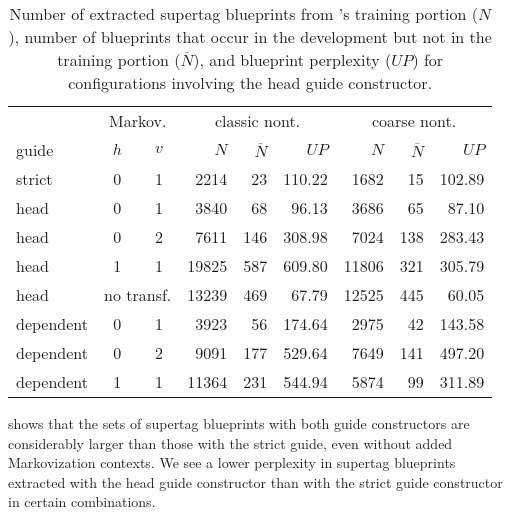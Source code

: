 \documentclass[../../document.tex]{subfiles}
\begin{document}
    \begin{table}
        \caption{\label{tbl:gridsearch:head:1}
        Number of extracted supertag blueprints from \negra{}'s training portion ($N$), number of blueprints that occur in the development but not in the training portion ($\overline{N}$), and blueprint perplexity ($\mathit{UP}$) for configurations involving the head guide constructor.
        }
        \centering
        \vspace{.2cm}
        \begin{tabular}{lcc|rrr|rrr}
            \toprule
            & \multicolumn{2}{c|}{Markov.} & \multicolumn{3}{c|}{classic nont.} &  \multicolumn{3}{c}{coarse nont.} \\
guide      & \(h\) & \(v\) & $N$ & $\overline{N}$ & $\mathit{UP}$ & $N$ & $\overline{N}$ & $\mathit{UP}$  \\ \hline \rowcolor{black!10}
strict     & 0 & 1 & 2214 & 23 & 110.22 & 1682 & 15 & 102.89 \\\hline
head & 0 & 1 & 3840 & 68 & 96.13 & 3686 & 65 & 87.10 \\
head & 0 & 2 & 7611 & 146 & 308.98 & 7024 & 138 & 283.43 \\
head & 1 & 1 & 19825 & 587 & 609.80 & 11806 & 321 & 305.79 \\
head & \multicolumn{2}{c|}{no transf.}  & 13239 & 469 & 67.79 & 12525 & 445 & 60.05 \\ \hline
dependent & 0 & 1 & 3923 & 56 & 174.64 & 2975 & 42 & 143.58 \\
dependent & 0 & 2 & 9091 & 177 & 529.64 & 7649 & 141 & 497.20 \\
dependent & 1 & 1 & 11364 & 231 & 544.94 & 5874 & 99 & 311.89 \\
\bottomrule
        \end{tabular}
    \end{table}

     shows that the sets of supertag blueprints with both guide constructors are considerably larger than those with the strict guide, even without added Markovization contexts.
    We see a lower perplexity in supertag blueprints extracted with the head guide constructor than with the strict guide constructor in certain combinations.
\end{document}
